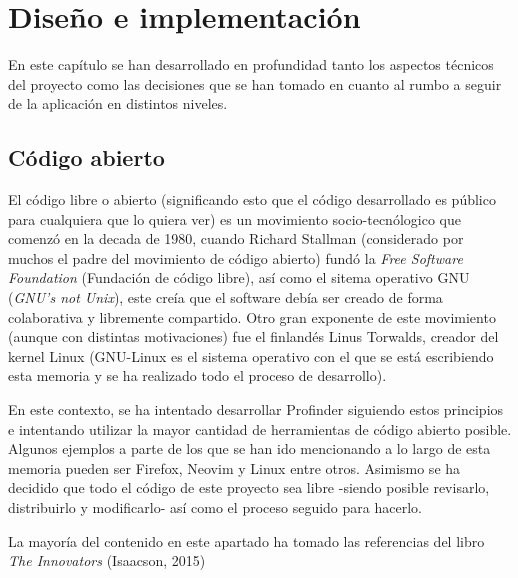 \chapter{Diseño e implementación}
\label{cap:disenoEImpl}
En este capítulo se han desarrollado en profundidad tanto los aspectos técnicos del proyecto como las decisiones que se han tomado en cuanto al rumbo a seguir de la aplicación en distintos niveles.
\section{Código abierto}
\label{subsec:openSource}
El código libre o abierto (significando esto que el código desarrollado es público para cualquiera que lo quiera ver)
es un movimiento socio-tecnólogico que comenzó en la decada de 1980, cuando Richard Stallman (considerado por muchos el padre del movimiento de código abierto) fundó la \textit{Free Software Foundation} (Fundación de código libre)\hyperlink{cap:biblio}{}, así como el sitema operativo GNU\hyperlink{cap:biblio}{} (\textit{GNU's not Unix}), este creía que el software debía ser  creado de forma colaborativa y libremente compartido. Otro gran exponente de este movimiento (aunque con distintas motivaciones) fue el finlandés Linus Torwalds, creador del kernel Linux (GNU-Linux es el sistema operativo con el que se está escribiendo esta memoria y se ha realizado todo el proceso de desarrollo).

En este contexto, se ha intentado desarrollar Profinder siguiendo estos principios e intentando utilizar la mayor cantidad de herramientas de código abierto posible. Algunos ejemplos a parte de los que se han ido mencionando a lo largo de esta memoria pueden ser 
Firefox\hyperlink{cap:biblio}{}, Neovim\hyperlink{cap:biblio}{} y Linux\hyperlink{cap:biblio}{} entre otros. Asimismo se ha decidido que todo el código de este proyecto sea libre -siendo posible revisarlo, distribuirlo y modificarlo- así como el proceso seguido para hacerlo.

La mayoría del contenido en este apartado ha tomado las referencias del libro \textit{The Innovators} (Isaacson, 2015)\hyperlink{cap:biblio}{} 

